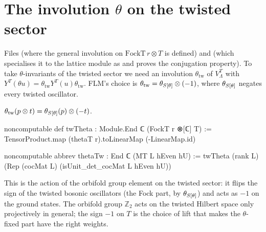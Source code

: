 \section{The involution \texorpdfstring{$\theta$}{theta} on the twisted sector}\label{ch08:sec:thetatw}

Files  (where the general involution
 on $\mathrm{FockT}\,r\otimes T$ is defined) and
 (which specialises it to the lattice module as
 and proves the conjugation property).  To take $\theta$-invariants of the twisted
sector we need an involution $\theta_{\mathrm{tw}}$ of $V_\Lambda^T$ with
$Y^T(\theta u)=\theta_{\mathrm{tw}}Y^T(u)\theta_{\mathrm{tw}}$.  FLM's choice is
$\theta_{\mathrm{tw}}=\theta_{S[\theta]}\otimes(-1)$, where $\theta_{S[\theta]}$ negates every twisted
oscillator.

\begin{definition}\label{ch08:def:twTheta}
$\theta_{\mathrm{tw}}(p\otimes t)=\theta_{S[\theta]}(p)\otimes(-t)$.
\end{definition}
\begin{leancode}
noncomputable def twTheta : Module.End ℂ (FockT r ⊗[ℂ] T) :=
  TensorProduct.map (thetaT r).toLinearMap (-LinearMap.id)

noncomputable abbrev thetaTw : End ℂ (MT L hEven hU) :=
  twTheta (rank L) (Rep (cocMat L) (isUnit_det_cocMat L hEven hU))
\end{leancode}

\begin{physics}
This is the action of the orbifold group element on the twisted sector: it flips the sign of the twisted bosonic oscillators (the Fock part, by $\theta_{S[\theta]}$) and acts as $-1$ on the ground states. The orbifold group $\mathbb Z_2$ acts on the twisted Hilbert space only projectively in general; the sign $-1$ on $T$ is the choice of lift that makes the $\theta$-fixed part have the right weights.
\end{physics}

